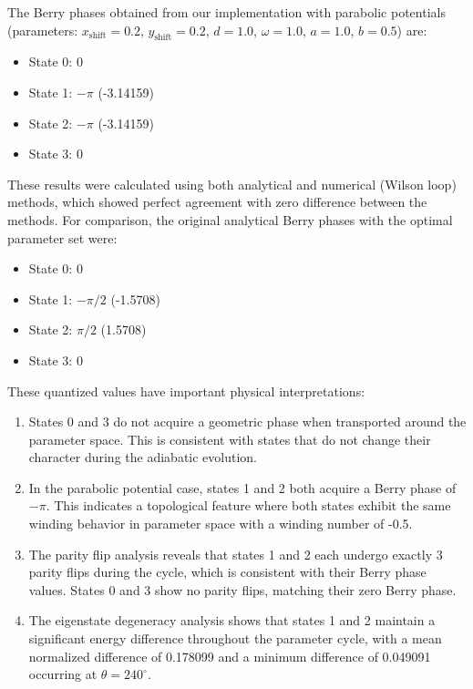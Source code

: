 \documentclass[12pt,a4paper]{article}
\begin{document}
The Berry phases obtained from our implementation with parabolic potentials (parameters: $x_{\text{shift}}=0.2$, $y_{\text{shift}}=0.2$, $d=1.0$, $\omega=1.0$, $a=1.0$, $b=0.5$) are:

\begin{itemize}
    \item State 0: 0
    \item State 1: $-\pi$ (-3.14159)
    \item State 2: $-\pi$ (-3.14159)
    \item State 3: 0
\end{itemize}

These results were calculated using both analytical and numerical (Wilson loop) methods, which showed perfect agreement with zero difference between the methods. For comparison, the original analytical Berry phases with the optimal parameter set were:

\begin{itemize}
    \item State 0: 0
    \item State 1: $-\pi/2$ (-1.5708)
    \item State 2: $\pi/2$ (1.5708)
    \item State 3: 0
\end{itemize}

These quantized values have important physical interpretations:

\begin{enumerate}
    \item States 0 and 3 do not acquire a geometric phase when transported around the parameter space. This is consistent with states that do not change their character during the adiabatic evolution.
    
    \item In the parabolic potential case, states 1 and 2 both acquire a Berry phase of $-\pi$. This indicates a topological feature where both states exhibit the same winding behavior in parameter space with a winding number of -0.5.
    
    \item The parity flip analysis reveals that states 1 and 2 each undergo exactly 3 parity flips during the cycle, which is consistent with their Berry phase values. States 0 and 3 show no parity flips, matching their zero Berry phase.
    
    \item The eigenstate degeneracy analysis shows that states 1 and 2 maintain a significant energy difference throughout the parameter cycle, with a mean normalized difference of 0.178099 and a minimum difference of 0.049091 occurring at $\theta = 240^\circ$.
\end{enumerate}
\end{document}
